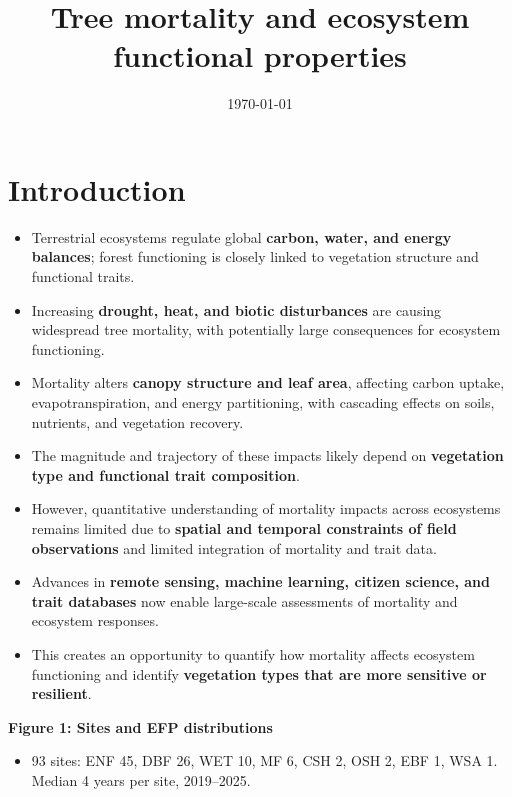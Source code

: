 \documentclass[11pt,a4paper]{article}
\title{\vspace{-1.5cm}Tree mortality and ecosystem functional properties\\[2pt]}
\author{}
\date{\today}
\begin{document}
\maketitle
\vspace{-1cm}

\section*{Introduction}
    \begin{itemize}
    \item Terrestrial ecosystems regulate global \textbf{carbon, water, and energy balances}; forest functioning is closely linked to vegetation structure and functional traits.
    
    \item Increasing \textbf{drought, heat, and biotic disturbances} are causing widespread tree mortality, with potentially large consequences for ecosystem functioning.
    
    \item Mortality alters \textbf{canopy structure and leaf area}, affecting carbon uptake, evapotranspiration, and energy partitioning, with cascading effects on soils, nutrients, and vegetation recovery.
    
    \item The magnitude and trajectory of these impacts likely depend on \textbf{vegetation type and functional trait composition}.
    
    \item However, quantitative understanding of mortality impacts across ecosystems remains limited due to \textbf{spatial and temporal constraints of field observations} and limited integration of mortality and trait data.
    
    \item Advances in \textbf{remote sensing, machine learning, citizen science, and trait databases} now enable large-scale assessments of mortality and ecosystem responses.
    
    \item This creates an opportunity to quantify how mortality affects ecosystem functioning and identify \textbf{vegetation types that are more sensitive or resilient}.
\end{itemize}

\textbf{Figure 1: Sites and EFP distributions}
\begin{itemize}
  \item 93 sites: ENF 45, DBF 26, WET 10, MF 6, CSH 2, OSH 2, EBF 1, WSA 1. Median 4 years per site, 2019--2025.

  
\end{itemize}
\end{document}

